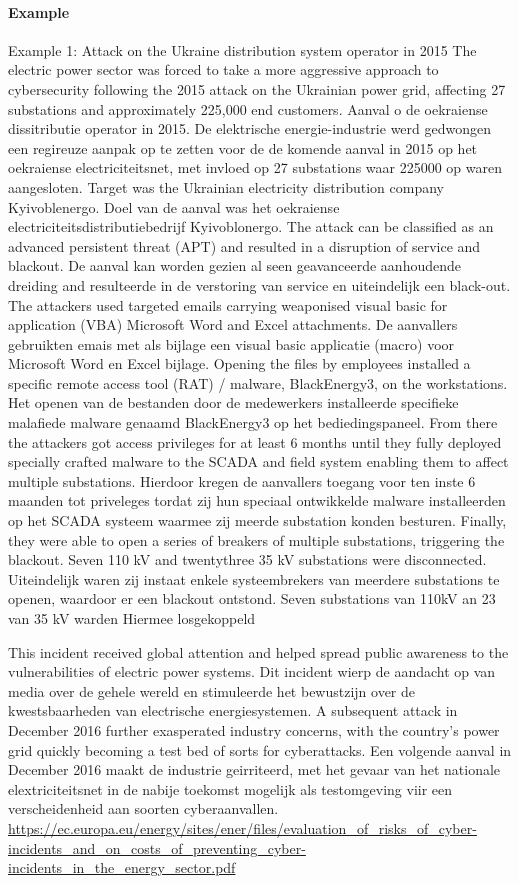 	\paragraph{Example}
	Example 1: Attack on the Ukraine distribution system operator in 2015 The electric power sector was
	forced to take a more aggressive approach to cybersecurity following the 2015 attack on the
	Ukrainian power grid, affecting 27 substations and approximately 225,000 end customers. Aanval o
	de oekraiense dissitributie operator in 2015. De elektrische energie-industrie werd gedwongen een
	regireuze aanpak op te zetten voor de de komende aanval in 2015 op het oekraiense electriciteitsnet,
	met invloed op 27 substations waar 225000 op waren aangesloten.
	Target was the Ukrainian electricity distribution company Kyivoblenergo. Doel van de aanval was het
	oekraiense electriciteitsdistributiebedrijf Kyivoblonergo.
	The attack can be classified as an advanced persistent threat (APT) and resulted in a disruption of
	service and blackout. De aanval kan worden gezien al seen geavanceerde aanhoudende dreiding and
	resulteerde in de verstoring van service en uiteindelijk een black-out.
	The attackers used targeted emails carrying weaponised visual basic for application (VBA) Microsoft
	Word and Excel attachments. De aanvallers gebruikten emais met als bijlage een visual basic
	applicatie (macro) voor Microsoft Word en Excel bijlage.
	Opening the files by employees installed a specific remote access tool (RAT) / malware,
	BlackEnergy3, on the workstations. Het openen van de bestanden door de medewerkers installeerde
	specifieke malafiede malware genaamd BlackEnergy3 op het bediedingspaneel.
	From there the attackers got access privileges for at least 6 months until they fully deployed specially
	crafted malware to the SCADA and field system enabling them to affect multiple substations.
	Hierdoor kregen de aanvallers toegang voor ten inste 6 maanden tot priveleges tordat zij hun
	speciaal ontwikkelde malware installeerden op het SCADA systeem waarmee zij meerde substation
	konden besturen.
	Finally, they were able to open a series of breakers of multiple substations, triggering the blackout.
	Seven 110 kV and twentythree 35 kV substations were disconnected. Uiteindelijk waren zij instaat
	enkele systeembrekers van meerdere substations te openen, waardoor er een blackout ontstond.
	Seven substations van 110kV an 23 van 35 kV warden Hiermee losgekoppeld
	
	This incident received global attention and helped spread public awareness to the vulnerabilities of
	electric power systems. Dit incident wierp de aandacht op van media over de gehele wereld en
	stimuleerde het bewustzijn over de kwestsbaarheden van electrische energiesystemen.
	A subsequent attack in December 2016 further exasperated industry concerns, with the country’s
	power grid quickly becoming a test bed of sorts for cyberattacks. Een volgende aanval in December
	2016 maakt de industrie geirriteerd, met het gevaar van het nationale elextriciteitsnet in de nabije
	toekomst mogelijk als testomgeving viir een verscheidenheid aan soorten cyberaanvallen.
	\url{https://ec.europa.eu/energy/sites/ener/files/evaluation_of_risks_of_cyber-incidents_and_on_costs_of_preventing_cyber-incidents_in_the_energy_sector.pdf}
